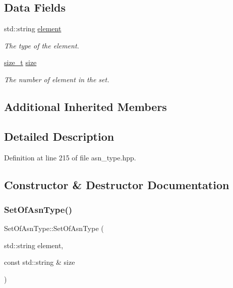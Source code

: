 \subsection*{Data Fields}
\begin{DoxyCompactItemize}
\item 
std\+::string \hyperlink{classSetOfAsnType_a615627490388391643a0ca1b70a46ecb}{element}
\begin{DoxyCompactList}\small\item\em The type of the element. \end{DoxyCompactList}\item 
\hyperlink{tutorial__fpt__2017_2intro_2sixth_2test_8c_a7c94ea6f8948649f8d181ae55911eeaf}{size\+\_\+t} \hyperlink{classSetOfAsnType_a497aa01dd40b76c0e2d74e7b73727916}{size}
\begin{DoxyCompactList}\small\item\em The number of element in the set. \end{DoxyCompactList}\end{DoxyCompactItemize}
\subsection*{Additional Inherited Members}


\subsection{Detailed Description}


Definition at line 215 of file asn\+\_\+type.\+hpp.



\subsection{Constructor \& Destructor Documentation}
\mbox{\label{classSetOfAsnType_addf7371e0515c52c434e71c104a8c506}} 
\subsubsection{\texorpdfstring{Set\+Of\+Asn\+Type()}{SetOfAsnType()}}
{\footnotesize\ttfamily Set\+Of\+Asn\+Type\+::\+Set\+Of\+Asn\+Type (\begin{DoxyParamCaption}\item[{std\+::string}]{element,  }\item[{const std\+::string \&}]{size }\end{DoxyParamCaption})}



